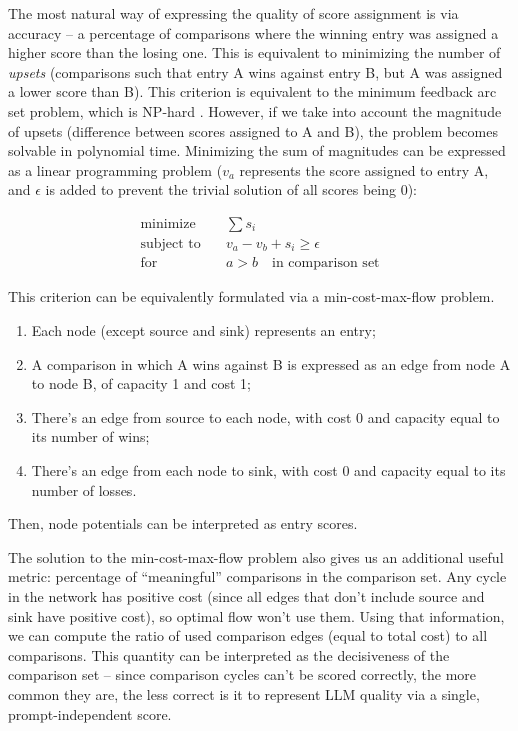 \documentclass[a4paper,11pt,twoside]{report}
\theoremstyle{definition}
\begin{document}
The most natural way of expressing the quality of score assignment is via accuracy -- a percentage of comparisons where the winning entry was assigned a higher score than the losing one. This is equivalent to minimizing the number of \textit{upsets} (comparisons such that entry A wins against entry B, but A was assigned a lower score than B). This criterion is equivalent to the minimum feedback arc set problem, which is NP-hard \cite{karp1972reducibility}. However, if we take into account the magnitude of upsets (difference between scores assigned to A and B), the problem becomes solvable in polynomial time. Minimizing the sum of magnitudes can be expressed as a linear programming problem ($v_a$ represents the score assigned to entry A, and $\epsilon$ is added to prevent the trivial solution of all scores being 0):

\begin{align*}
    \textrm{minimize} & \quad \sum s_i \\
    \textrm{subject to} & \quad v_a - v_b + s_i \geq \epsilon \\
    \textrm{for} & \quad a > b \quad \textrm{in comparison set}
\end{align*}

This criterion can be equivalently formulated via a min-cost-max-flow problem.

\begin{enumerate}
    \item Each node (except source and sink) represents an entry;
    \item A comparison in which A wins against B is expressed as an edge from node A to node B, of capacity 1 and cost 1;
    \item There's an edge from source to each node, with cost 0 and capacity equal to its number of wins;
    \item There's an edge from each node to sink, with cost 0 and capacity equal to its number of losses.
\end{enumerate}

Then, node potentials can be interpreted as entry scores.

The solution to the min-cost-max-flow problem also gives us an additional useful metric: percentage of ``meaningful'' comparisons in the comparison set. Any cycle in the network has positive cost (since all edges that don't include source and sink have positive cost), so optimal flow won't use them. Using that information, we can compute the ratio of used comparison edges (equal to total cost) to all comparisons. This quantity can be interpreted as the decisiveness of the comparison set -- since comparison cycles can't be scored correctly, the more common they are, the less correct is it to represent LLM quality via a single, prompt-independent score.
\end{document}
